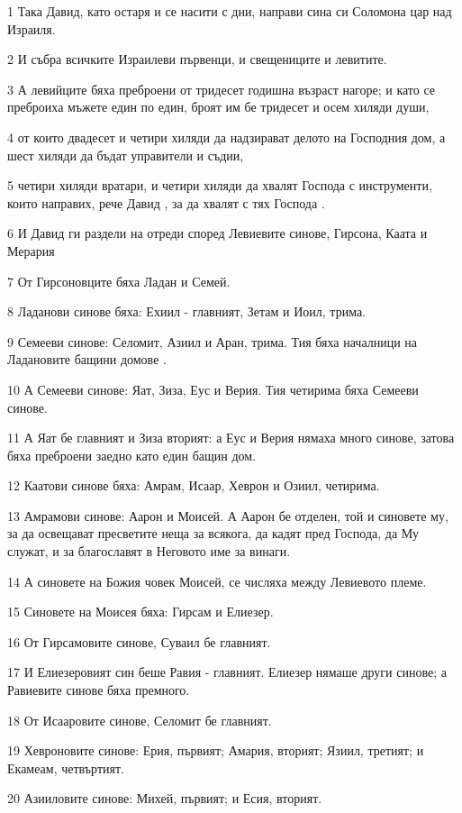 \par 1 Така Давид, като остаря и се насити с дни, направи сина си Соломона цар над Израиля.
\par 2 И събра всичките Израилеви първенци, и свещениците и левитите.
\par 3 А левийците бяха преброени от тридесет годишна възраст нагоре; и като се преброиха мъжете един по един, броят им бе тридесет и осем хиляди души,
\par 4 от които двадесет и четири хиляди да надзирават делото на Господния дом, а шест хиляди да бъдат управители и съдии,
\par 5 четири хиляди вратари, и четири хиляди да хвалят Господа с инструменти, които направих, рече Давид , за да хвалят с тях Господа .
\par 6 И Давид ги раздели на отреди според Левиевите синове, Гирсона, Каата и Мерария
\par 7 От Гирсоновците бяха Ладан и Семей.
\par 8 Ладанови синове бяха: Ехиил - главният, Зетам и Иоил, трима.
\par 9 Семееви синове: Селомит, Азиил и Аран, трима. Тия бяха началници на Ладановите бащини домове .
\par 10 А Семееви синове: Яат, Зиза, Еус и Верия. Тия четирима бяха Семееви синове.
\par 11 А Яат бе главният и Зиза вторият: а Еус и Верия нямаха много синове, затова бяха преброени заедно като един бащин дом.
\par 12 Каатови синове бяха: Амрам, Исаар, Хеврон и Озиил, четирима.
\par 13 Амрамови синове: Аарон и Моисей. А Аарон бе отделен, той и синовете му, за да освещават пресветите неща за всякога, да кадят пред Господа, да Му служат, и за благославят в Неговото име за винаги.
\par 14 А синовете на Божия човек Моисей, се числяха между Левиевото племе.
\par 15 Синовете на Моисея бяха: Гирсам и Елиезер.
\par 16 От Гирсамовите синове, Суваил бе главният.
\par 17 И Елиезеровият син беше Равия - главният. Елиезер нямаше други синове; а Равиевите синове бяха премного.
\par 18 От Исааровите синове, Селомит бе главният.
\par 19 Хевроновите синове: Ерия, първият; Амария, вторият; Язиил, третият; и Екамеам, четвъртият.
\par 20 Азииловите синове: Михей, първият; и Есия, вторият.
